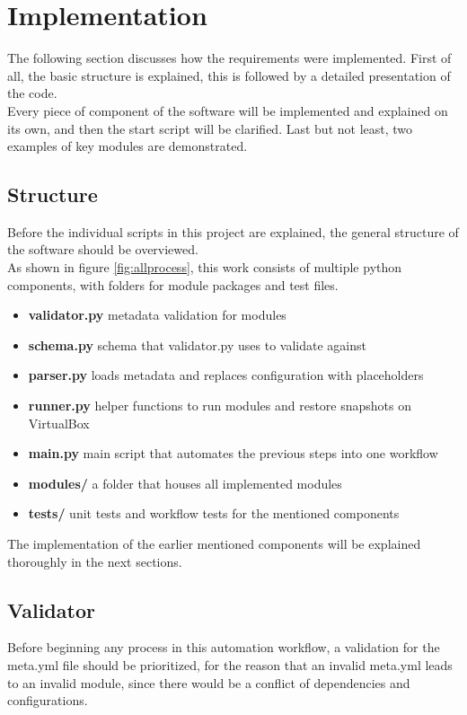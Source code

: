 \chapter{Implementation}
The following section discusses how the requirements were implemented. First of all, the basic structure is explained, this is followed by a detailed presentation of the code.\\
Every piece of component of the software will be implemented and explained on its own, and then the start script will be clarified. Last but not least, two examples of key modules are demonstrated.\\

\section{Structure}
Before the individual scripts in this project are explained, the general structure of the software should be overviewed.\\
As shown in figure \ref{fig:allprocess}, this work consists of multiple python components, with folders for module packages and test files.\\

\begin{itemize}
  \item \textbf{validator.py} metadata validation for modules
  \item \textbf{schema.py} schema that validator.py uses to validate against
  \item \textbf{parser.py} loads metadata and replaces configuration with placeholders
  \item \textbf{runner.py} helper functions to run modules and restore snapshots on VirtualBox
  \item \textbf{main.py} main script that automates the previous steps into one workflow
  \item \textbf{modules/} a folder that houses all implemented modules
  \item \textbf{tests/} unit tests and workflow tests for the mentioned components
\end{itemize}
The implementation of the earlier mentioned components will be explained thoroughly in the next sections.\\


\section{Validator}
Before beginning any process in this automation workflow, a validation for the meta.yml file should be prioritized, for the reason that an invalid meta.yml leads to an invalid module, since there would be a conflict of dependencies and configurations.\\

